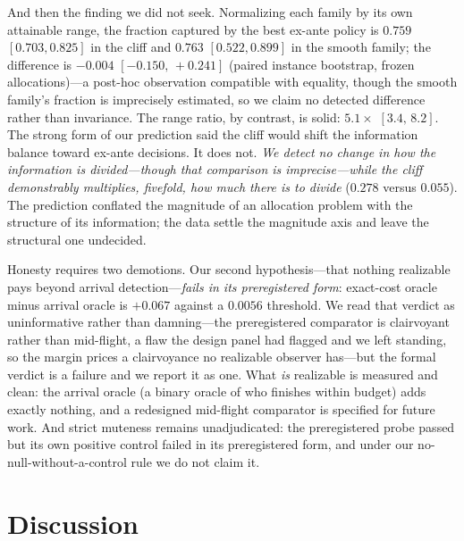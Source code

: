 \documentclass{article}
\newcommand{\NbLRangoCliff}{$0.278$} \newcommand{\NbLRangoSuave}{$0.055$}
\newcommand{\NbLFracCliff}{$0.759$} \newcommand{\NbLFracSuave}{$0.763$}
\newcommand{\FracDif}{$-0.004$} \newcommand{\FracDifIC}{$[-0.150,\,+0.241]$}
\newcommand{\RatioRangos}{$5.1\times$} \newcommand{\RatioRangosIC}{$[3.4,\,8.2]$}
\begin{document}
And then the finding we did not seek. Normalizing each family by its own
attainable range, the fraction captured by the best ex-ante policy is
\NbLFracCliff{} $[0.703, 0.825]$ in the cliff and \NbLFracSuave{}
$[0.522, 0.899]$ in the smooth family; the difference is \FracDif{}
\FracDifIC{} (paired instance bootstrap, frozen allocations)---a post-hoc
observation compatible with equality, though the smooth family's fraction
is imprecisely estimated, so we claim no detected difference rather than
invariance. The range ratio, by contrast, is solid: \RatioRangos{}
\RatioRangosIC{}. The strong form of our prediction said the
cliff would shift the information balance toward ex-ante decisions. It does
not. \emph{We detect no change in how the information is divided---though
that comparison is imprecise---while the cliff demonstrably multiplies,
fivefold, how much there is to divide} (\NbLRangoCliff{} versus
\NbLRangoSuave). The prediction conflated the magnitude of an allocation
problem with the structure of its information; the data settle the magnitude
axis and leave the structural one undecided.

Honesty requires two demotions. Our second hypothesis---that nothing
realizable pays beyond arrival detection---\emph{fails in its preregistered
form}: exact-cost oracle minus arrival oracle is $+0.067$ against a
$0.0056$ threshold. We read that verdict as uninformative rather than
damning---the preregistered comparator is clairvoyant rather than
mid-flight, a flaw the design panel had flagged and we left standing, so
the margin prices a clairvoyance no realizable observer has---but the
formal verdict is a failure and we report it as one. What \emph{is}
realizable is measured and clean: the arrival oracle (a binary oracle of
who finishes within budget) adds exactly nothing, and a redesigned
mid-flight comparator is specified for future work. And strict muteness remains
unadjudicated: the preregistered probe passed but its own positive control
failed in its preregistered form, and under our no-null-without-a-control
rule we do not claim it.

\section{Discussion}\label{sec:discussion}
\end{document}
